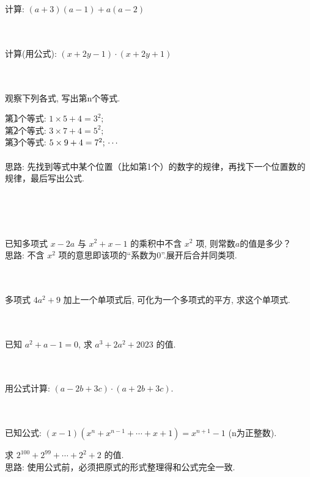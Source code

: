 \item{
    计算: $(a+3)(a-1) + a(a-2)$
}
\\ \\ \\

\item{
    计算(用公式): $(x+2y-1)\cdot (x+2y+1)$
}
\\ \\ \\

\item{
    观察下列各式, 写出第n个等式.

    第\textcircled{1}个等式: $1\times 5 + 4 = 3^2;$ \\
    第\textcircled{2}个等式: $3\times 7 + 4 = 5^2;$ \\
    第\textcircled{3}个等式: $5\times 9 + 4 = 7^2; \\ \cdots $ \\
    \ifshowSolution
    \fangsong{}
    \\
    思路: 先找到等式中某个位置（比如第1个）的数字的规律，再找下一个位置数的规律，最后写出公式.
    \fi
}
\\ \\ \\

\item{
    已知多项式 $x-2a$ 与 $x^2+x-1$ 的乘积中不含 $x^2$ 项, 则常数$a$的值是多少？
    \ifshowSolution
    \fangsong{}
    \\
    思路: 不含 $x^2$ 项的意思即该项的“系数为0”.展开后合并同类项.
    \fi
}
\\ \\ \\

\item{
    多项式 $4a^2+9$ 加上一个单项式后, 可化为一个多项式的平方, 求这个单项式.
}
\\ \\ \\

\item{
    已知 $a^2+a-1=0$, 求 $a^3 + 2a^2 + 2023$ 的值.
}
\\ \\ \\

\item{
    用公式计算: $(a-2b+3c)\cdot (a+2b+3c)$.
}
\\ \\ \\

\item{
    已知公式: $(x-1)(x^n + x^{n-1} + \cdots + x + 1) = x^{n+1} - 1$ (n为正整数).
    
    求 $2^{100} + 2^{99} +\cdots + 2^2 + 2$ 的值.
    \ifshowSolution
    \fangsong{}
    \\
    思路: 使用公式前，必须把原式的形式整理得和公式完全一致.
    \fi
}
\\ \\ \\